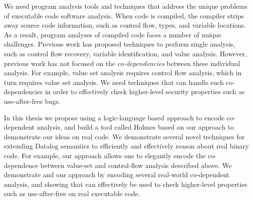 We need program analysis tools and techniques that address the unique problems of executable code software analysis.
When code is compiled, the compiler strips away source code information, such as control flow, types, and variable locations.
As a result, program analyses of compiled code faces a number of unique challenges.
Previous work has proposed techniques to perform single analysis, such as control flow recovery, variable identification, and value analysis.
However, previous work has not focused on the \emph{co-dependencies} between these individual analysis.
For example, value set analysis requires control flow analysis, which in turn requires value set
analysis.
We need techniques that can handle such co-dependencies in order to effectively check higher-level security properties such as use-after-free bugs.

In this thesis we propose using a logic-language based approach to encode co-dependent analysis, and build a tool called Holmes based on our approach to demonstrate our ideas on real code.
We demonstrate several novel techniques for extending Datalog semantics to efficiently and effectively reason about real binary code.
For example, our approach allows one to elegantly encode the co-dependence between value-set and control-flow analysis described above.
We demonstrate {\sysname} and our approach by encoding several real-world co-dependent analysis, and showing that {\sysname} can effectively be used to check higher-level properties such as use-after-free on real executable code.
